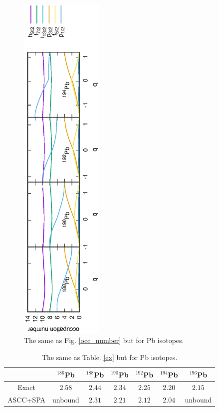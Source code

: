 \documentclass[%
superscriptaddress,
showpacs,
nofootinbib,
amsmath,amssymb,
aps,
prc,
twocolumn,
floatfix ]%
{revtex4-1}
\begin{document}
\begin{figure}[t]
 \begin{center}
  \includegraphics[width=40mm,angle=-90]{Pbocc_number.eps}
 \end{center}
	\caption{The same as Fig. \ref{occ_number} but for Pb isotopes.
}
 \label{Pb_occ_number}
\end{figure}

\begin{table}[htbp]
\begin{ruledtabular}
\begin{tabular}{c|cccccc}
   & ${}^{186}$Pb & ${}^{188}$Pb & ${}^{190}$Pb & ${}^{192}$Pb & ${}^{194}$Pb & ${}^{196}$Pb\\ \hline
 Exact & $2.58$ & $2.44$ & $2.34$ & $2.25$ & $2.20$ & $2.15$\\
ASCC+SPA & unbound & $2.31$ & $2.21$ & $2.12$ & $2.04$ & unbound \\ 
\end{tabular}
\end{ruledtabular}
\caption{The same as Table. \ref{ex} but for Pb isotopes.}
\label{Pb_ex}
\end{table}
\end{document}
